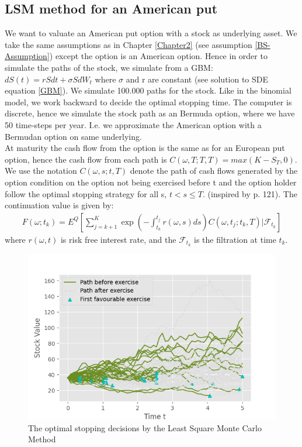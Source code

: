\subsection{LSM method for an American put}           
We want to valuate an American put option with a stock as underlying asset. We take the same assumptions as in Chapter \ref{Chapter2} (see assumption \ref{BS-Assumption}) except the option is an American option. Hence in order to simulate the paths of the stock, we simulate from a GBM: $dS(t)=rSdt + \sigma S dW_t$ where $\sigma$ and r are constant (see solution to SDE equation \ref{GBM}). We simulate 100.000 paths for the stock. Like in the binomial model, we work backward to decide the optimal stopping time. The computer is discrete, hence we simulate the stock path as an Bermuda option, where we have 50 time-steps per year. I.e. we approximate the American option with a Bermudan option on same underlying. \\

At maturity the cash flow from the option is the same as for an European put option, hence the cash flow from each path is $C(\omega,T;T, T)=max(K-S_T,0)$. We use the notation $C(\omega, s; t, T)$ denote the path of cash flows generated by the option condition on the option not being exercised before t and the option holder follow the optimal stopping strategy for all s, $t<s\leq T$.
(inspired by \parencite{lsm} p. 121). The continuation value is given by:
\begin{equation}\label{continuation-value}
\begin{split}
F(\omega; t_k)=E^Q[\sum_{j=k+1}^K \exp(-\int_{t_k}^{t_j} r(\omega,s) ds)C(\omega,t_j; t_k, T)|\mathcal{F}_{t_k}]
\end{split}
\end{equation}
where $r(\omega,t)$ is risk free interest rate, and the $\mathcal{F}_{t_k}$ is the filtration at time $t_k$.\\

\begin{figure}[H]
\centering
\includegraphics{Figures/LSMFit2.png}
\decoRule
\caption[Optimal Stopping Decision]{The optimal stopping decisions by the Least Square Monte Carlo Method}
\label{fig:binConv}
\end{figure}

